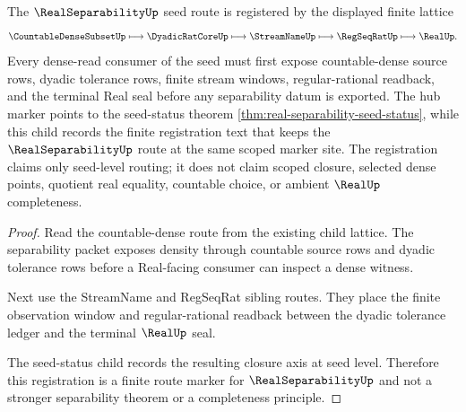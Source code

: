 \begin{theorem}
\label{thm:real-separability-seed-registration}
The $\RealSeparabilityUp$ seed route is registered by the displayed finite lattice
$$
\CountableDenseSubsetUp \longmapsto \DyadicRatCoreUp \longmapsto \StreamNameUp \longmapsto \RegSeqRatUp \longmapsto \RealUp .
$$
Every dense-read consumer of the seed must first expose countable-dense source rows, dyadic tolerance rows, finite stream windows, regular-rational readback, and the terminal Real seal before any separability datum is exported. The hub marker points to the seed-status theorem \autoref{thm:real-separability-seed-status}, while this child records the finite registration text that keeps the $\RealSeparabilityUp$ route at the same scoped marker site. The registration claims only seed-level routing; it does not claim scoped closure, selected dense points, quotient real equality, countable choice, or ambient $\RealUp$ completeness.
\end{theorem}
\begin{proof}
Read the countable-dense route from the existing child lattice. The separability packet exposes density through countable source rows and dyadic tolerance rows before a Real-facing consumer can inspect a dense witness.

Next use the StreamName and RegSeqRat sibling routes. They place the finite observation window and regular-rational readback between the dyadic tolerance ledger and the terminal $\RealUp$ seal.

The seed-status child records the resulting closure axis at seed level. Therefore this registration is a finite route marker for $\RealSeparabilityUp$ and not a stronger separability theorem or a completeness principle.
\end{proof}
